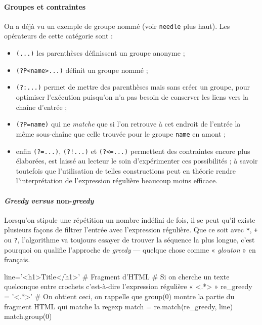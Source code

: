 \paragraph{Groupes et contraintes}
On a déjà vu un exemple de groupe nommé (voir \texttt{needle} plus haut). Les opérateurs de cette catégorie sont :
\begin{itemize}
\item \texttt{(...)} les parenthèses définissent un groupe anonyme ;
\item \texttt{(?P<name>...)} définit un groupe nommé ;
\item \texttt{(?:...)} permet de mettre des parenthèses mais sans créer un groupe, pour optimiser l'exécution puisqu'on n'a pas besoin de conserver les liens vers la chaîne d'entrée ;
\item \texttt{(?P=name)} qui ne \textit{matche} que si l'on retrouve à cet endroit de l'entrée la même sous-chaîne que celle trouvée pour le groupe \texttt{name} en amont ;
\item enfin \texttt{(?=...)}, \texttt{(?!...)} et \texttt{(?<=...)} permettent des contraintes encore plus élaborées, est laissé au lecteur le soin d'expérimenter ces possibilités ; à savoir toutefois que l'utilisation de telles constructions peut en théorie rendre l'interprétation de l'expression régulière beaucoup moins efficace.
\end{itemize}

\paragraph{\textit{Greedy} \textit{versus} non-\textit{greedy}}
Lorsqu'on stipule une répétition un nombre indéfini de fois, il se peut qu'il existe plusieurs façons de filtrer l'entrée avec l'expression régulière. Que ce soit avec \texttt{*}, \texttt{+} ou \texttt{?}, l'algorithme va toujours essayer de trouver la séquence la plus longue, c'est pourquoi on qualifie l'approche de \textit{greedy} --- quelque chose comme « \emph{glouton} » en français.

\begin{idleconsole*}
	\begin{pyconsole}
line='<h1>Title</h1>' # Fragment d'HTML
# Si on cherche un texte quelconque entre crochets c'est-à-dire l'expression régulière « <.*> »
re_greedy = '<.*>'
# On obtient ceci, on rappelle que group(0) montre la partie du fragment HTML qui matche la regexp
match = re.match(re_greedy, line)
match.group(0)
	\end{pyconsole}
\end{idleconsole*}

